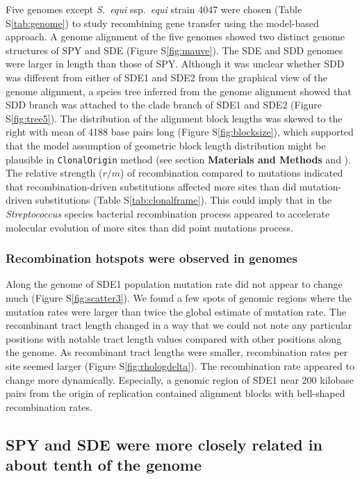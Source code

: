 \documentclass[english]{article}
\begin{document}
Five genomes except \textit{S.\ equi} ssp.\textit{\ equi} strain 4047 were
chosen (Table S\ref{tab:genome}) to study recombining gene transfer using the
model-based approach.  A genome alignment of the five genomes showed two
distinct genome structures of SPY and SDE (Figure S\ref{fig:mauve}). The SDE and
SDD genomes were larger in length than those of SPY. Although it was unclear
whether SDD was different from either of SDE1 and SDE2 from the graphical view
of the genome alignment, a spcies tree inferred from the genome alignment
showed that SDD branch was attached to the clade branch of SDE1 and SDE2 (Figure
S\ref{fig:tree5}). The distribution of the alignment block lengths was skewed to
the right with mean of 4188 base pairs long (Figure S\ref{fig:blocksize}), which
supported that the model assumption of geometric block length distribution might
be plausible in \texttt{ClonalOrigin} method (see section \textbf{Materials and
Methods} and \citealt{Didelot2010}).  The relative strength ($r/m$) of
recombination compared to mutations indicated that recombination-driven
substitutions affected more sites than did mutation-driven substitutions (Table
S\ref{tab:clonalframe}). This could imply that in the \textit{Streptococcus}
species bacterial recombination process appeared to accelerate molecular
evolution of more sites than did point mutations process.

\subsubsection{Recombination hotspots were observed in genomes}

Along the genome of SDE1 population mutation rate did not appear to change much
(Figure S\ref{fig:scatter3}).  We found a few spots of genomic regions where the
mutation rates were larger than twice the global estimate of mutation rate.  The
recombinant tract length changed in a way that we could not note any particular
positions with notable tract length values compared with other positions along
the genome.  As recombinant tract lengths were smaller, recombination rates per
site seemed larger (Figure S\ref{fig:rhologdelta}).  The recombination rate
appeared to change more dynamically. Especially, a genomic region of SDE1 near
200 kilobase pairs from the origin of replication contained alignment blocks with
bell-shaped recombination rates.  

\subsection{SPY and SDE were more closely related in about tenth of the genome}
\end{document}
